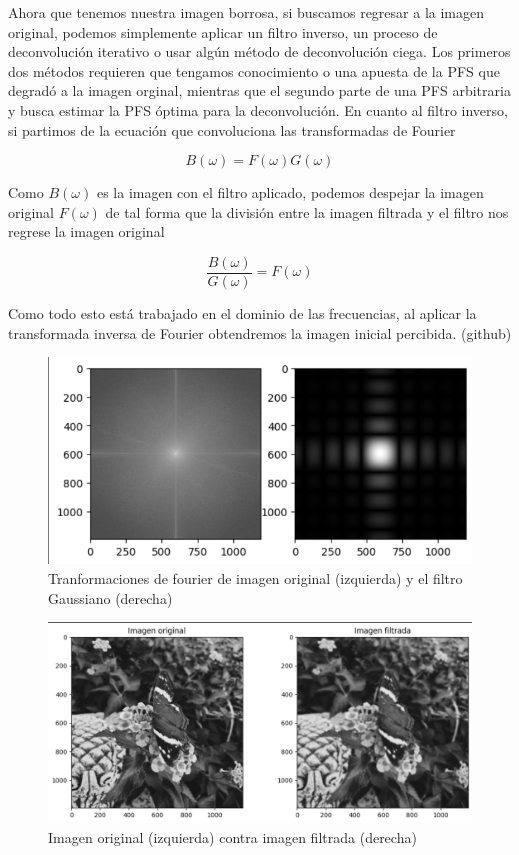 \documentclass[eng]{ajceam-class}
\begin{document}
Ahora que tenemos nuestra imagen borrosa, si buscamos regresar a la imagen original, podemos simplemente aplicar un filtro inverso, un proceso de deconvolución iterativo o usar algún método de deconvolución ciega. Los primeros dos métodos requieren que tengamos conocimiento o una apuesta de la PFS que degradó a la imagen orginal, mientras que el segundo parte de una PFS arbitraria y busca estimar la PFS óptima para la deconvolución. En cuanto al filtro inverso, si partimos de la ecuación que convoluciona las transformadas de Fourier

\begin{equation}
    B(\omega) = F(\omega)G(\omega)
\end{equation}

Como $B(\omega)$ es la imagen con el filtro aplicado, podemos despejar la imagen original $F(\omega)$ de tal forma que la división entre la imagen filtrada y el filtro nos regrese la imagen original


\begin{equation}
    \frac{B(\omega)}{G(\omega)} = F(\omega)
\end{equation}   

Como todo esto está trabajado en el dominio de las frecuencias, al aplicar la transformada inversa de Fourier obtendremos la imagen inicial percibida. (github)

\begin{figure}[!h] 
 \centering
 \includegraphics[width=.8\columnwidth]{transformaciones.png} 
 \caption{Tranformaciones de fourier de imagen original (izquierda) y el filtro Gaussiano (derecha)} \label{fig-1}
\end{figure}

\begin{figure}[!h] 
 \centering
 \includegraphics[width=.8\columnwidth]{convolucion.png} 
 \caption{Imagen original (izquierda) contra imagen filtrada (derecha)} \label{fig-1}
\end{figure}
\end{document}
